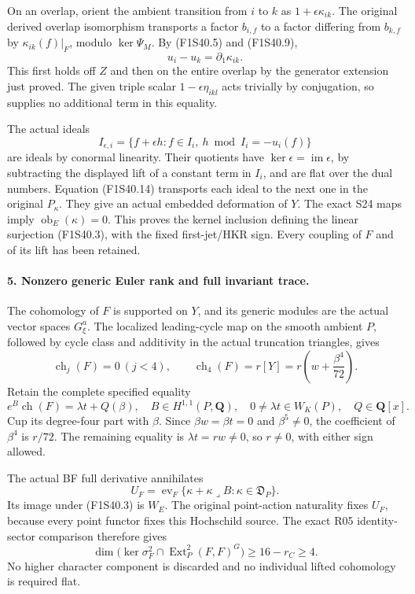 On an overlap, orient the ambient transition from
$i$ to $k$ as $1+\epsilon\kappa_{ik}$.
The original derived overlap isomorphism transports
a factor $b_{i,f}$ to a factor differing from
$b_{k,f}$ by $\kappa_{ik}(f)|_F$, modulo
$\ker\Psi_M$. By (F1S40.5) and (F1S40.9),
\[
                         u_i-u_k=\partial_1\kappa_{ik}.
 \tag{F1S40.14}
\]
This first holds off $Z$ and then on the entire
overlap by the generator extension just proved.
The given triple scalar $1-\epsilon\eta_{ikl}$
acts trivially by conjugation, so supplies no
additional term in this equality.

The actual ideals
\[
 I_{\epsilon,i}=\{f+\epsilon h:f\in I_i,
                             \ h\bmod I_i=-u_i(f)\}
 \tag{F1S40.15}
\]
are ideals by conormal linearity. Their quotients
have $\ker\epsilon=\operatorname{im}\epsilon$,
by subtracting the displayed lift of a constant
term in $I_i$, and are flat over the dual numbers.
Equation (F1S40.14) transports each ideal to the
next one in the original $P_\kappa$.
They give an actual embedded deformation of $Y$.
The exact S24 maps imply
$\operatorname{ob}_E(\kappa)=0$.
This proves the kernel inclusion defining the
linear surjection (F1S40.3), with the fixed
first-jet/HKR sign. Every coupling of $F$ and
of its lift has been retained.

\paragraph{5. Nonzero generic Euler rank and full invariant trace.}
The cohomology of $F$ is supported on $Y$, and
its generic modules are the actual vector spaces
$G^a_\xi$. The localized leading-cycle map on
the smooth ambient $P$, followed by cycle class
and additivity in the actual truncation triangles,
gives
\[
 \operatorname{ch}_j(F)=0\ (j<4),\qquad
 \operatorname{ch}_4(F)=r[Y]
             =r\left(w+\frac{\beta^4}{72}\right).
 \tag{F1S40.16}
\]
Retain the complete specified equality
\[
 e^B\operatorname{ch}(F)=\lambda t+Q(\beta),
 \quad B\in H^{1,1}(P,\mathbf Q),\quad
 0\ne\lambda t\in W_K(P),\quad Q\in\mathbf Q[x].
 \tag{F1S40.17}
\]
Cup its degree-four part with $\beta$.
Since $\beta w=\beta t=0$ and $\beta^5\ne0$,
the coefficient of $\beta^4$ is $r/72$.
The remaining equality is $\lambda t=rw\ne0$,
so $r\ne0$, with either sign allowed.

The actual BF full derivative annihilates
\[
 U_F=\operatorname{ev}_F
       \{\kappa+\kappa\mathbin{\lrcorner}B:
                           \kappa\in\mathfrak D_P\}.
 \tag{F1S40.18}
\]
Its image under (F1S40.3) is $W_E$.
The original point-action naturality fixes $U_F$,
because every point functor fixes this Hochschild
source. The exact R05 identity-sector comparison
therefore gives
\[
 \dim\bigl(\ker\sigma_F^2
       \cap\operatorname{Ext}^2_P(F,F)^G\bigr)
                            \ge16-r_C\ge4.
 \tag{F1S40.19}
\]
No higher character component is discarded and
no individual lifted cohomology is required flat.


